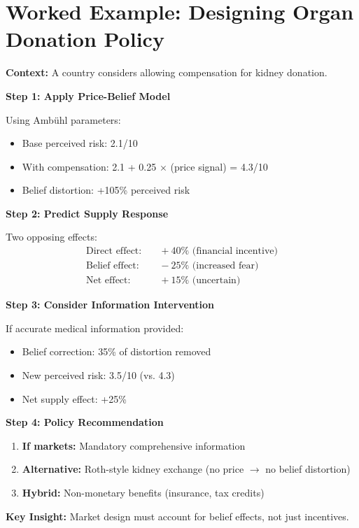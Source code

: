 \section{Worked Example: Designing Organ Donation Policy}

\begin{tcolorbox}[colback=blue!5!white,colframe=blue!75!black,title=Application: Kidney Exchange vs. Market Design]
\textbf{Context:} A country considers allowing compensation for kidney donation.

\textbf{Step 1: Apply Price-Belief Model}

Using Ambühl parameters:
\begin{itemize}
    \item Base perceived risk: 2.1/10
    \item With compensation: 2.1 + 0.25 $\times$ (price signal) = 4.3/10
    \item Belief distortion: +105\% perceived risk
\end{itemize}

\textbf{Step 2: Predict Supply Response}

Two opposing effects:
\begin{align}
\text{Direct effect:} & \quad +40\% \text{ (financial incentive)} \\
\text{Belief effect:} & \quad -25\% \text{ (increased fear)} \\
\text{Net effect:} & \quad +15\% \text{ (uncertain)}
\end{align}

\textbf{Step 3: Consider Information Intervention}

If accurate medical information provided:
\begin{itemize}
    \item Belief correction: 35\% of distortion removed
    \item New perceived risk: 3.5/10 (vs. 4.3)
    \item Net supply effect: +25\%
\end{itemize}

\textbf{Step 4: Policy Recommendation}

\begin{enumerate}
    \item \textbf{If markets:} Mandatory comprehensive information
    \item \textbf{Alternative:} Roth-style kidney exchange (no price $\rightarrow$ no belief distortion)
    \item \textbf{Hybrid:} Non-monetary benefits (insurance, tax credits)
\end{enumerate}

\textbf{Key Insight:} Market design must account for belief effects, not just incentives.
\end{tcolorbox}

